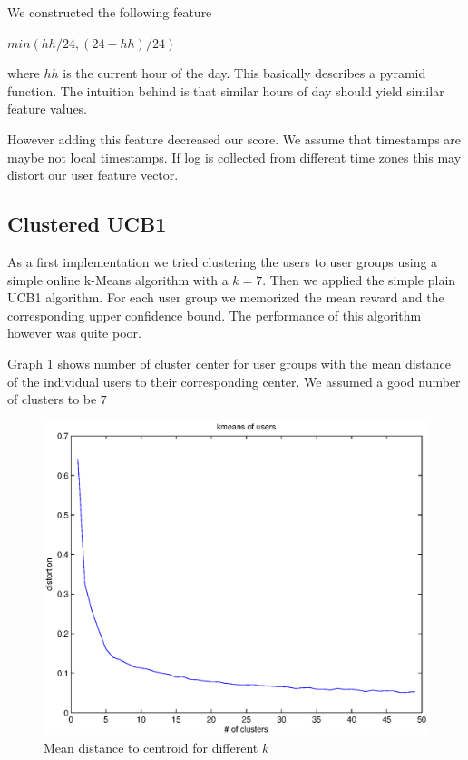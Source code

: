 \documentclass[a4paper, 11pt]{article}
\begin{document}
We constructed the following feature 

$ min\left(  hh / 24, (24 - hh) / 24\right)$

where $hh$ is the current hour of the day. This basically describes a pyramid function. The intuition behind is that similar hours of day should yield similar feature values.

However adding this feature decreased our score. We assume that timestamps are maybe not local timestamps. If log is collected from different time zones this may distort our user feature vector.


\subsection{Clustered UCB1}
As a first implementation we tried clustering the users to user groups using a simple online k-Means algorithm with a $k=7$. Then we applied the simple plain UCB1 algorithm. For each user group we memorized the mean reward and the corresponding upper confidence bound. The performance of this algorithm however was quite poor.

Graph \ref{fig:proj4-kmeans_users} shows number of cluster center for user groups with the mean distance of the individual users to their corresponding center. We assumed a good number of clusters to be $7$

\begin{figure}[H]
\centering
\includegraphics[scale=0.5]{project4/kmeans_users.eps}
\caption{Mean distance to centroid for different $k$}
\label{fig:proj4-kmeans_users}
\end{figure}
\end{document}
